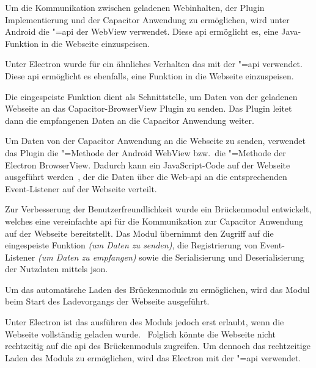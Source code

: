 Um die Kommunikation zwischen geladenen Webinhalten, der Plugin Implementierung und der Capacitor Anwendung zu ermöglichen, wird unter Android die "=\acs{api} der WebView verwendet.
Diese \ac{api} ermöglicht es, eine Java-Funktion in die Webseite einzuspeisen.~\cite{android:api}

Unter Electron wurde für ein ähnliches Verhalten das  mit der "=\acs{api} verwendet.
Diese \ac{api} ermöglicht es ebenfalls, eine Funktion in die Webseite einzuspeisen.~\cite{electron}

Die eingespeiste Funktion dient als Schnittstelle, um Daten von der geladenen Webseite an das Capacitor-BrowserView Plugin zu senden.
Das Plugin leitet dann die empfangenen Daten an die Capacitor Anwendung weiter.

Um Daten von der Capacitor Anwendung an die Webseite zu senden, verwendet das Plugin die "=Methode der Android WebView bzw.\ die "=Methode der Electron BrowserView.
Dadurch kann ein JavaScript-Code auf der Webseite ausgeführt werden~\cite{android:api, electron}, der die Daten über die  Web-\acs{api} an die entsprechenden Event-Listener auf der Webseite verteilt.

Zur Verbesserung der Benutzerfreundlichkeit wurde ein Brückenmodul entwickelt, welches eine vereinfachte \ac{api} für die Kommunikation zur Capacitor Anwendung auf der Webseite bereitstellt.
Das Modul übernimmt den Zugriff auf die eingespeiste Funktion \textit{(um Daten zu senden)}, die Registrierung von Event-Listener \textit{(um Daten zu empfangen)} sowie die Serialisierung und Deserialisierung der Nutzdaten mittels \ac{json}.

Um das automatische Laden des Brückenmoduls zu ermöglichen, wird das Modul beim Start des Ladevorgangs der Webseite ausgeführt.

Unter Electron ist das ausführen des Moduls jedoch erst erlaubt, wenn die Webseite vollständig geladen wurde.~\cite{electron}
Folglich könnte die Webseite nicht rechtzeitig auf die \ac{api} des Brückenmoduls zugreifen.
Um dennoch das rechtzeitige Laden des Moduls zu ermöglichen, wird das Electron  mit der "=\acs{api} verwendet.

\printfn
